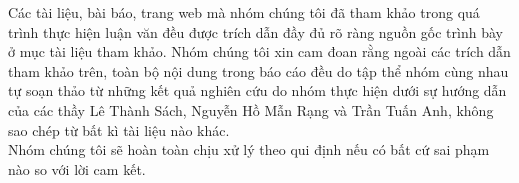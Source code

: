 
\begin{declaration}
{\fontsize{15}{1} \selectfont
\noindent Các tài liệu, bài báo, trang web mà nhóm chúng tôi đã tham khảo trong quá trình thực hiện luận văn đều được trích dẫn đầy đủ rõ ràng nguồn gốc trình bày ở mục tài liệu tham khảo. Nhóm chúng tôi xin cam đoan rằng ngoài các trích dẫn tham khảo trên, toàn bộ nội dung trong báo cáo đều do tập thể nhóm cùng nhau tự soạn thảo từ những kết quả nghiên cứu do nhóm thực hiện dưới sự hướng dẫn của các thầy Lê Thành Sách, Nguyễn Hồ Mẫn Rạng và Trần Tuấn Anh, không sao chép từ bất kì tài liệu nào khác. \\
\indent Nhóm chúng tôi sẽ hoàn toàn chịu xử lý theo qui định nếu có bất cứ sai phạm nào so với lời cam kết.}
\end{declaration}